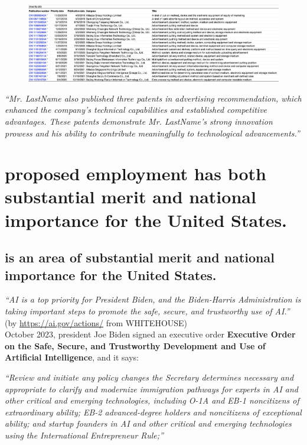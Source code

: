 \documentclass[11pt]{article}
\let\oldenquote\enquote
\renewcommand{\enquote}[1]{{\itshape\oldenquote{#1}}}
\begin{document}
\begin{figure}[h!]
\centering
\includegraphics[width=1.0\textwidth]{papers/patent_cites2.png}
\end{figure}


\enquote{Mr. LastName also published three patents in advertising recommendation, which enhanced the company's technical capabilities and established competitive advantages. These patents demonstrate Mr. LastName's strong innovation prowess and his ability to contribute meaningfully to technological advancements.} 



\pagebreak


\section{\drs proposed employment has both substantial merit and national importance for the United States.}
\label{section2}

\subsection{ \fie{} is an area of substantial merit and national importance for the United States. }
\label{section21}

\enquote{AI is a top priority for President Biden, and the Biden-Harris Administration is taking important steps to promote the safe, secure, and trustworthy use of AI.} (by \ul{https://ai.gov/actions/} from WHITEHOUSE) \\

October 2023, president Joe Biden signed an executive order \textbf{Executive Order on the Safe, Secure, and Trustworthy Development and Use of Artificial Intelligence}, and it says:

\enquote{Review and initiate any policy changes the Secretary determines necessary and appropriate to clarify and modernize immigration pathways for experts in AI and other critical and emerging technologies, including O-1A and EB-1 noncitizens of extraordinary ability; EB-2 advanced-degree holders and noncitizens of exceptional ability; and startup founders in AI and other critical and emerging technologies using the International Entrepreneur Rule;} \\
\end{document}
